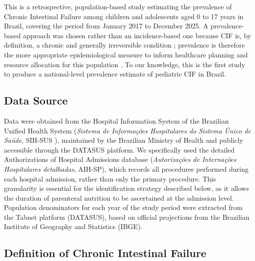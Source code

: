 \documentclass[12pt,a4paper]{article}
\theoremstyle{plain}
\theoremstyle{definition}
\theoremstyle{remark}
\begin{document}
This is a retrospective, population-based study estimating the prevalence of Chronic Intestinal Failure among children and adolescents aged 0 to 17 years in Brazil, covering the period from January 2017 to December 2025. A prevalence-based approach was chosen rather than an incidence-based one because CIF is, by definition, a chronic and generally irreversible condition \cite{goulet2006causes}; prevalence is therefore the more appropriate epidemiological measure to inform healthcare planning and resource allocation for this population \cite{aspen2022pif}. To our knowledge, this is the first study to produce a national-level prevalence estimate of pediatric CIF in Brazil.

\subsection*{Data Source}

Data were obtained from the Hospital Information System of the Brazilian Unified Health System (\textit{Sistema de Informa\c{c}\~oes Hospitalares do Sistema \'{U}nico de Sa\'{u}de}, SIH-SUS \citep{datasus_sihsus}), maintained by the Brazilian Ministry of Health and publicly accessible through the DATASUS platform. We specifically used the detailed Authorizations of Hospital Admissions database (\textit{Autoriza\c{c}\~oes de Interna\c{c}\~oes Hospitalares detalhadas}, AIH-SP), which records all procedures performed during each hospital admission, rather than only the primary procedure. This granularity is essential for the identification strategy described below, as it allows the duration of parenteral nutrition to be ascertained at the admission level. Population denominators for each year of the study period were extracted from the Tabnet platform (DATASUS), based on official projections from the Brazilian Institute of Geography and Statistics (IBGE).

\subsection*{Definition of Chronic Intestinal Failure}
\end{document}
